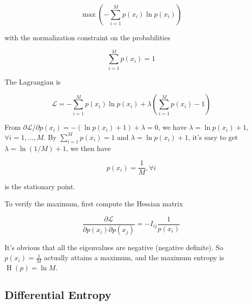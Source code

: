 \documentclass{article}
\begin{document}
                \begin{equation*}
                     \max \left( - \sum_{i=1}^M p(x_i) \ln p(x_i) \right)
                \end{equation*}

                with the normalization constraint on the probabilities

                \begin{equation*}
                     \sum_{i=1}^M p(x_i) = 1
                \end{equation*}

                The Lagrangian is

                \begin{equation*}
                     \mathcal{L} = -\sum_{i=1}^M p(x_i)\ln p(x_i) +
                     \lambda\left(\sum_{i=1}^M p(x_i) - 1\right)
                \end{equation*}

                From $ \partial \mathcal{L} / \partial p(x_i) = - ( \ln p(x_i) + 1) +
                \lambda = 0 $, we have $ \lambda = \ln p(x_i) + 1 $,
                $ \forall i = 1, \dots, M $. By $ \sum_{i=1}^M p(x_{i}) = 1 $ and $
                \lambda = \ln p(x_i) + 1 $, it's easy to get $ \lambda = \ln(1 / M)
                + 1 $, we then have 

                \begin{equation*}
                     p(x_i) = \frac{1}{M},\forall i
                \end{equation*}

                is the stationary point.

                To verify the maximum, first compute the Hessian matrix

                \begin{equation*}
                     \frac{\partial \mathcal{L}}{\partial p(x_{i}) \partial
                     p(x_{j})} = - I_{ij} \frac{1}{p(x_i)}
                \end{equation*}

                It's obvious that all the eigenvalues are negative (negative
                definite). So $ p(x_{i}) = \frac{1}{M} $ actually attains a
                maximum, and the maximum entropy is $ \operatorname{H}(p) = \ln M $.

            

            
        \subsection{Differential Entropy}
\end{document}
